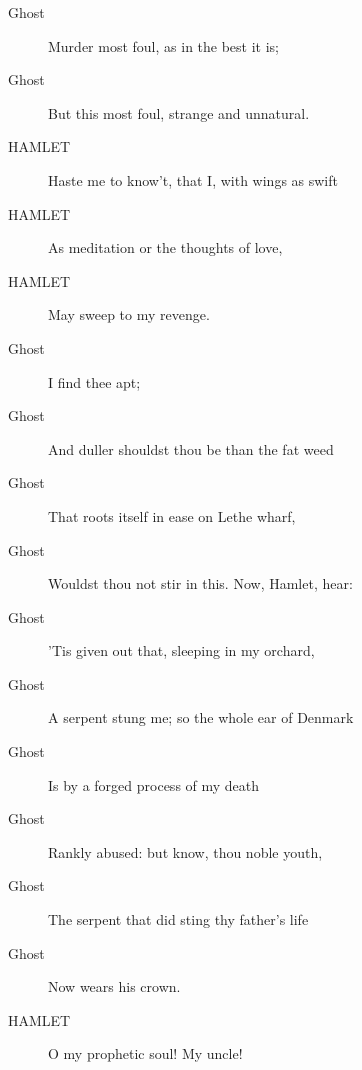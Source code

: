\documentclass{article}
\begin{document}
\begin{description}
            
\item[Ghost] Murder most foul, as in the best it is;
\item[Ghost] But this most foul, strange and unnatural.
\end{description}
          
\begin{description}
            
\item[HAMLET] Haste me to know't, that I, with wings as swift
\item[HAMLET] As meditation or the thoughts of love,
\item[HAMLET] May sweep to my revenge.
\end{description}
          
\begin{description}
            
\item[Ghost] I find thee apt;
\item[Ghost] And duller shouldst thou be than the fat weed
\item[Ghost] That roots itself in ease on Lethe wharf,
\item[Ghost] Wouldst thou not stir in this. Now, Hamlet, hear:
\item[Ghost] 'Tis given out that, sleeping in my orchard,
\item[Ghost] A serpent stung me; so the whole ear of Denmark
\item[Ghost] Is by a forged process of my death
\item[Ghost] Rankly abused: but know, thou noble youth,
\item[Ghost] The serpent that did sting thy father's life
\item[Ghost] Now wears his crown.
\end{description}
          
\begin{description}
            
\item[HAMLET] O my prophetic soul! My uncle!
\end{description}
          
\end{document}
